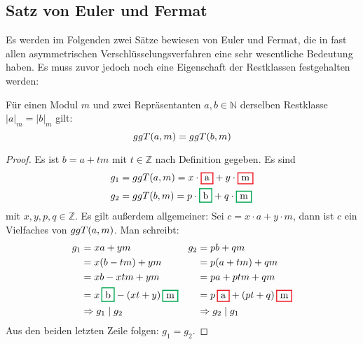 \subsection{Satz von Euler und Fermat}
Es werden im Folgenden zwei Sätze bewiesen von Euler und Fermat, die
in fast allen asymmetrischen Verschlüsselungsverfahren eine sehr wesentliche Bedeutung haben.
Es muss zuvor jedoch noch eine Eigenschaft der Restklassen festgehalten werden:

\begin{satz}
  \label{satz:restklasse-ggt}
  Für einen Modul $m$ und zwei Repräsentanten $a,b \in \mathbb{N}$ derselben
  Restklasse $\vert a \vert_m = \vert b \vert_m$ gilt:
  \begin{equation*}
    ggT(a,m) = ggT(b,m)
  \end{equation*}
\end{satz}
\begin{proof}
  Es ist $b = a + tm$ mit $t \in \mathbb{Z}$ nach Definition gegeben. Es sind
  \begin{align*}
    g_1 & = \ggt{a}{m} = x \cdot \hl{Red}{a} + y \cdot \hl{Red}{m}     \\
    g_2 & = \ggt{b}{m} = p \cdot \hl{Green}{b} + q \cdot \hl{Green}{m}
  \end{align*}
  mit $x,y,p,q \in \mathbb{Z}$. Es gilt außerdem allgemeiner: Sei $c = x \cdot a + y \cdot m$,
  dann ist $c$ ein Vielfaches von $ggT(a,m)$.
  Man schreibt:
  \begin{align*}
    g_1 & = xa + ym                                    & g_2 & = pb + qm                                \\
        & = x(b - tm) + ym                             &     & = p(a + tm) + qm                         \\
        & = xb - xtm + ym                              &     & = pa + ptm + qm                          \\
        & = x\,\hl{Green}{b} - (xt + y)\,\hl{Green}{m} &     & = p\,\hl{Red}{a} + (pt + q)\,\hl{Red}{m} \\
        & \Rightarrow g_1 \mid g_2                     &     & \Rightarrow g_2 \mid g_1
  \end{align*}
  Aus den beiden letzten Zeile folgen: $g_1 = g_2$.
\end{proof}



